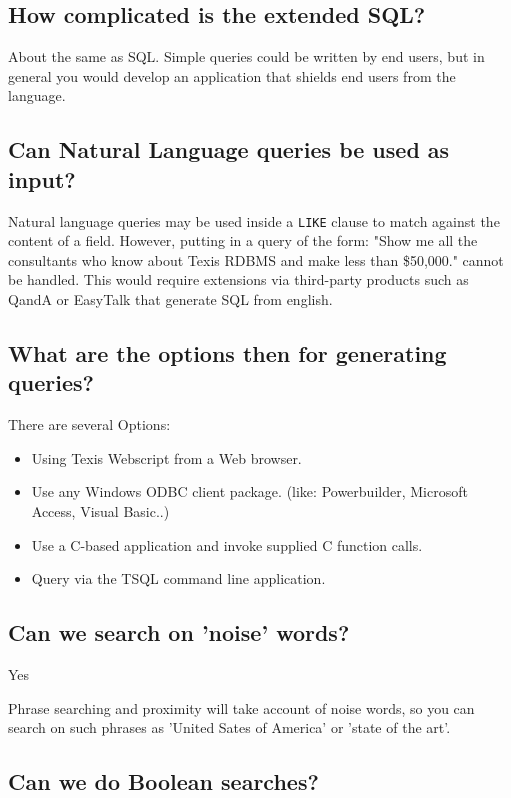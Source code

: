 \subsection{How complicated is the extended SQL?}

About the same as SQL.  Simple queries could be written by end users, but
in general you would develop an application that shields end users from
the language.

\subsection{Can Natural Language queries be used as input?}

Natural language queries may be used inside a \verb`LIKE` clause to match against
the content of a field.  However, putting in a query of the form:  "Show
me all the consultants who know about Texis RDBMS and make less than
\$50,000." cannot be handled.  This would require extensions via
third-party products such as QandA or EasyTalk that generate SQL from
english.

\subsection{What are the options then for generating queries?}

There are several Options:
\begin{itemize}
 \item  Using Texis Webscript from a Web browser.

 \item  Use any Windows ODBC client package.  (like:  Powerbuilder,
         Microsoft Access, Visual Basic..)

 \item  Use a  C-based application and invoke supplied C function calls.

 \item  Query via the TSQL command line application.
\end{itemize}
\subsection{Can we search on 'noise' words?}

Yes

Phrase searching and proximity will take account of noise words, so you can
search on such phrases as 'United Sates of America' or 'state of the art'.

\subsection{Can we do Boolean searches?}


